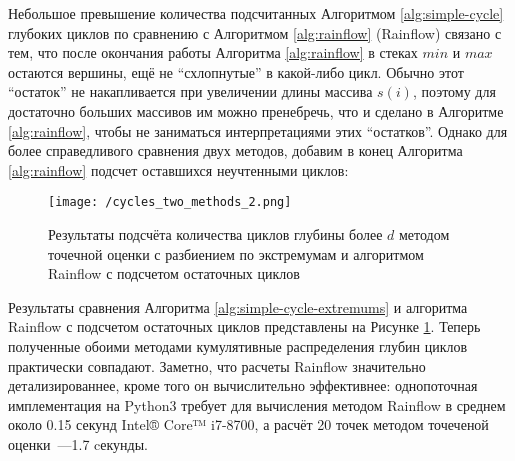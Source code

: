 Небольшое превышение количества подсчитанных Алгоритмом \ref{alg:simple-cycle} глубоких циклов по сравнению с Алгоритмом \ref{alg:rainflow} (Rainflow) связано с тем, что после окончания работы Алгоритма \ref{alg:rainflow} в стеках $min$ и $max$ остаются вершины, ещё не ``схлопнутые'' в какой-либо цикл. 
Обычно этот ``остаток'' не накапливается при увеличении длины массива $s(i)$, поэтому для достаточно больших массивов им можно пренебречь, что и сделано в Алгоритме \ref{alg:rainflow}, чтобы не заниматься интерпретациями этих ``остатков''.
Однако для более справедливого сравнения двух методов, добавим в конец  Алгоритма \ref{alg:rainflow} подсчет оставшихся неучтенными циклов:
\begin{algorithmic}
\EndWhile
\end{algorithmic}


\begin{figure}[h]
\texttt{[image: /cycles\_two\_methods\_2.png]}
\caption{Результаты подсчёта количества циклов глубины более $d$ методом точечной оценки с разбиением по экстремумам и алгоритмом Rainflow с подсчетом остаточных циклов}
\centering
\label{fig:cycles-two-methods-2}
\end{figure}

Результаты сравнения Алгоритма \ref{alg:simple-cycle-extremums} и алгоритма Rainflow с подсчетом остаточных циклов представлены на Рисунке \ref{fig:cycles-two-methods-2}.
Теперь полученные обоими методами кумулятивные распределения глубин циклов практически совпадают.
Заметно, что расчеты Rainflow значительно детализированнее, кроме того он вычислительно эффективнее: однопоточная имплементация на Python3 требует для вычисления методом Rainflow в среднем около 0.15 секунд Intel® Core™ i7-8700, а расчёт 20 точек методом точеченой оценки~---1.7 cекунды.

